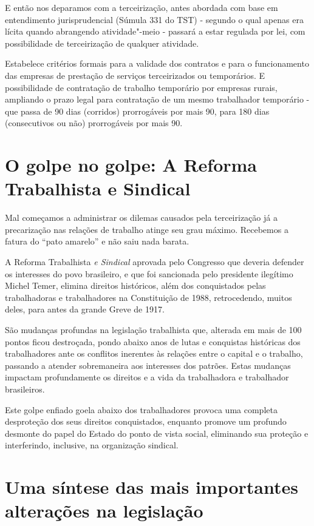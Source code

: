E então nos deparamos com a terceirização, antes abordada com base em
entendimento jurisprudencial (Súmula 331 do TST) - segundo o qual apenas
era lícita quando abrangendo atividade"-meio - passará a estar regulada
por lei, com possibilidade de terceirização de qualquer atividade.

Estabelece critérios formais para a validade dos contratos e para o
funcionamento das empresas de prestação de serviços terceirizados ou
temporários. E possibilidade de contratação de trabalho temporário por
empresas rurais, ampliando o prazo legal para contratação de um mesmo
trabalhador temporário - que passa de 90 dias (corridos) prorrogáveis
por mais 90, para 180 dias (consecutivos ou não) prorrogáveis por mais
90.

\section{O golpe no golpe: A Reforma Trabalhista e Sindical}

Mal começamos a administrar os dilemas causados pela terceirização já a
precarização nas relações de trabalho atinge seu grau máximo. Recebemos
a fatura do ``pato amarelo'' e não saiu nada barata.

A Reforma Trabalhista \emph{e Sindical} aprovada pelo Congresso que
deveria defender os interesses do povo brasileiro, e que foi sancionada
pelo presidente ilegítimo Michel Temer, elimina direitos históricos,
além dos conquistados pelas trabalhadoras e trabalhadores na
Constituição de 1988, retrocedendo, muitos deles, para antes da grande
Greve de 1917.

São mudanças profundas na legislação trabalhista que, alterada em mais
de 100 pontos ficou destroçada, pondo abaixo anos de lutas e conquistas
históricas dos trabalhadores ante os conflitos inerentes às relações
entre o capital e o trabalho, passando a atender sobremaneira aos
interesses dos patrões. Estas mudanças impactam profundamente os
direitos e a vida da trabalhadora e trabalhador brasileiros.

Este golpe enfiado goela abaixo dos trabalhadores provoca uma completa
desproteção dos seus direitos conquistados, enquanto promove um profundo
desmonte do papel do Estado do ponto de vista social, eliminando sua
proteção e interferindo, inclusive, na organização sindical.

\section{Uma síntese das mais importantes alterações na legislação}

